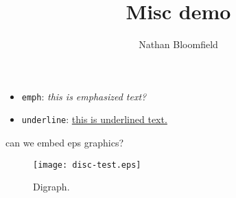 \documentclass{ximera}
\title{Misc demo}
\author{Nathan Bloomfield}
\begin{document}
\maketitle

\begin{itemize}
\item \texttt{emph}: \emph{this is emphasized text?}
\item \texttt{underline}: \underline{this is underlined text.}
\end{itemize}

can we embed eps graphics?

\begin{figure}[!htb]
\centering
\texttt{[image: disc-test.eps]}
\caption{Digraph.}
\label{fig:digraph}
\end{figure}
\end{document}
